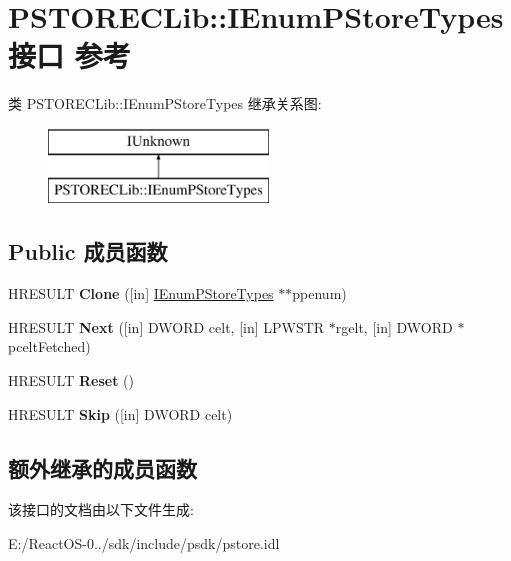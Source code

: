 \hypertarget{interface_p_s_t_o_r_e_c_lib_1_1_i_enum_p_store_types}{}\section{P\+S\+T\+O\+R\+E\+C\+Lib\+:\+:I\+Enum\+P\+Store\+Types接口 参考}
\label{interface_p_s_t_o_r_e_c_lib_1_1_i_enum_p_store_types}
类 P\+S\+T\+O\+R\+E\+C\+Lib\+:\+:I\+Enum\+P\+Store\+Types 继承关系图\+:\begin{figure}[H]
\begin{center}
\leavevmode
\includegraphics[height=2.000000cm]{interface_p_s_t_o_r_e_c_lib_1_1_i_enum_p_store_types}
\end{center}
\end{figure}
\subsection*{Public 成员函数}
\begin{DoxyCompactItemize}
\item 
\mbox{\label{interface_p_s_t_o_r_e_c_lib_1_1_i_enum_p_store_types_a48a3bdb9d4b2ae73cd7c59e3f981adaa}} 
H\+R\+E\+S\+U\+LT {\bfseries Clone} (\mbox{[}in\mbox{]} \hyperlink{interface_p_s_t_o_r_e_c_lib_1_1_i_enum_p_store_types}{I\+Enum\+P\+Store\+Types} $\ast$$\ast$ppenum)
\item 
\mbox{\label{interface_p_s_t_o_r_e_c_lib_1_1_i_enum_p_store_types_abf9c9430b31036ac783be645cecac647}} 
H\+R\+E\+S\+U\+LT {\bfseries Next} (\mbox{[}in\mbox{]} D\+W\+O\+RD celt, \mbox{[}in\mbox{]} L\+P\+W\+S\+TR $\ast$rgelt, \mbox{[}in\mbox{]} D\+W\+O\+RD $\ast$pcelt\+Fetched)
\item 
\mbox{\label{interface_p_s_t_o_r_e_c_lib_1_1_i_enum_p_store_types_a5810cd964f672f9d4fe11ab971acfe11}} 
H\+R\+E\+S\+U\+LT {\bfseries Reset} ()
\item 
\mbox{\label{interface_p_s_t_o_r_e_c_lib_1_1_i_enum_p_store_types_a4c2b2ce3580781393aba4097197608c2}} 
H\+R\+E\+S\+U\+LT {\bfseries Skip} (\mbox{[}in\mbox{]} D\+W\+O\+RD celt)
\end{DoxyCompactItemize}
\subsection*{额外继承的成员函数}


该接口的文档由以下文件生成\+:\begin{DoxyCompactItemize}
\item 
E\+:/\+React\+O\+S-\/0../sdk/include/psdk/pstore.\+idl\end{DoxyCompactItemize}
